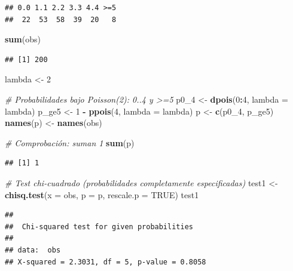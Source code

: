\documentclass[
]{article}
\newenvironment{Shaded}{\begin{snugshade}}{\end{snugshade}}
\newcommand{\AttributeTok}[1]{\textcolor[rgb]{0.13,0.29,0.53}{#1}}
\newcommand{\CommentTok}[1]{\textcolor[rgb]{0.56,0.35,0.01}{\textit{#1}}}
\newcommand{\ConstantTok}[1]{\textcolor[rgb]{0.56,0.35,0.01}{#1}}
\newcommand{\DecValTok}[1]{\textcolor[rgb]{0.00,0.00,0.81}{#1}}
\newcommand{\FunctionTok}[1]{\textcolor[rgb]{0.13,0.29,0.53}{\textbf{#1}}}
\newcommand{\NormalTok}[1]{#1}
\newcommand{\OtherTok}[1]{\textcolor[rgb]{0.56,0.35,0.01}{#1}}
\newcommand{\SpecialCharTok}[1]{\textcolor[rgb]{0.81,0.36,0.00}{\textbf{#1}}}
\begin{document}
\begin{verbatim}
## 0.0 1.1 2.2 3.3 4.4 >=5 
##  22  53  58  39  20   8
\end{verbatim}

\begin{Shaded}
\begin{Highlighting}[]
\FunctionTok{sum}\NormalTok{(obs)}
\end{Highlighting}
\end{Shaded}

\begin{verbatim}
## [1] 200
\end{verbatim}

\begin{Shaded}
\begin{Highlighting}[]
\NormalTok{lambda }\OtherTok{\textless{}{-}} \DecValTok{2}

\CommentTok{\# Probabilidades bajo Poisson(2): 0..4 y \textgreater{}=5}
\NormalTok{p0\_4 }\OtherTok{\textless{}{-}} \FunctionTok{dpois}\NormalTok{(}\DecValTok{0}\SpecialCharTok{:}\DecValTok{4}\NormalTok{, }\AttributeTok{lambda =}\NormalTok{ lambda)}
\NormalTok{p\_ge5 }\OtherTok{\textless{}{-}} \DecValTok{1} \SpecialCharTok{{-}} \FunctionTok{ppois}\NormalTok{(}\DecValTok{4}\NormalTok{, }\AttributeTok{lambda =}\NormalTok{ lambda)}
\NormalTok{p }\OtherTok{\textless{}{-}} \FunctionTok{c}\NormalTok{(p0\_4, p\_ge5)}
\FunctionTok{names}\NormalTok{(p) }\OtherTok{\textless{}{-}} \FunctionTok{names}\NormalTok{(obs)}

\CommentTok{\# Comprobación: suman 1}
\FunctionTok{sum}\NormalTok{(p)}
\end{Highlighting}
\end{Shaded}

\begin{verbatim}
## [1] 1
\end{verbatim}

\begin{Shaded}
\begin{Highlighting}[]
\CommentTok{\# Test chi{-}cuadrado (probabilidades completamente especificadas)}
\NormalTok{test1 }\OtherTok{\textless{}{-}} \FunctionTok{chisq.test}\NormalTok{(}\AttributeTok{x =}\NormalTok{ obs, }\AttributeTok{p =}\NormalTok{ p, }\AttributeTok{rescale.p =} \ConstantTok{TRUE}\NormalTok{)}
\NormalTok{test1}
\end{Highlighting}
\end{Shaded}

\begin{verbatim}
## 
##  Chi-squared test for given probabilities
## 
## data:  obs
## X-squared = 2.3031, df = 5, p-value = 0.8058
\end{verbatim}
\end{document}

